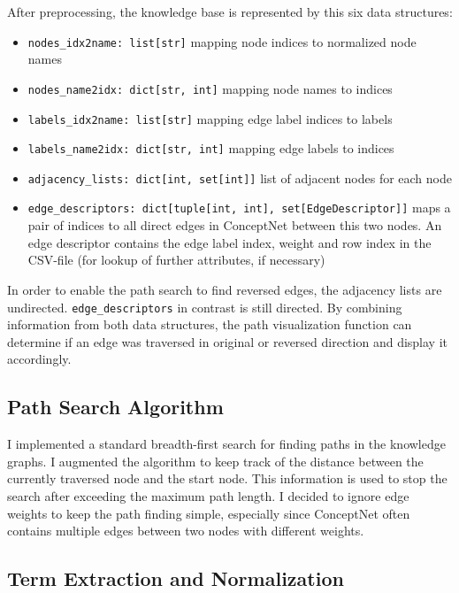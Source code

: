 \documentclass{article}
\begin{document}

After preprocessing, the knowledge base is represented by this six data structures:

\begin{itemize}
\item \verb`nodes_idx2name: list[str]` mapping node indices to normalized node names
\item \verb`nodes_name2idx: dict[str, int]` mapping node names to indices
\item \verb`labels_idx2name: list[str]` mapping edge label indices to labels
\item \verb`labels_name2idx: dict[str, int]` mapping edge labels to indices
\item \verb`adjacency_lists: dict[int, set[int]]` list of adjacent nodes for each node
\item \verb`edge_descriptors: dict[tuple[int, int], set[EdgeDescriptor]]` maps a pair of indices to all
  direct edges in ConceptNet between this two nodes. An edge descriptor contains the edge label
  index, weight and row index in the CSV-file (for lookup of further attributes, if necessary)
\end{itemize}
  
In order to enable the path search to find reversed edges, the
adjacency lists are undirected.  \verb`edge_descriptors` in contrast is still
directed. By combining information from both data structures, the path
visualization function can determine if an edge was traversed in
original or reversed direction and display it accordingly.

\subsection*{Path Search Algorithm}
\label{sec:path-finding}



I implemented a standard breadth-first search for finding paths in the
knowledge graphs. I augmented the algorithm to keep track of the
distance between the currently traversed node and the start node.
This information is used to stop the search after exceeding the
maximum path length. I decided to ignore edge weights to keep the path
finding simple, especially since ConceptNet often contains multiple
edges between two nodes with different weights.

\subsection*{Term Extraction and Normalization}
\label{sec:term-extraction}
\end{document}

